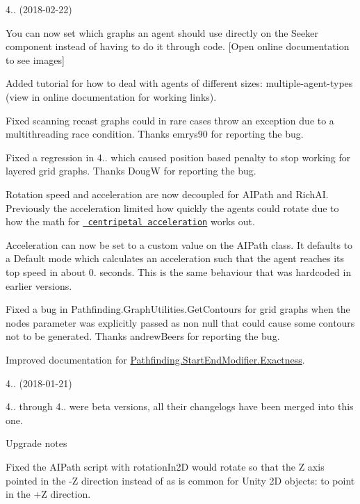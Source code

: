 \begin{DoxyItemize}
\item 4.. (2018-\/02-\/22)
\begin{DoxyItemize}
\item You can now set which graphs an agent should use directly on the Seeker component instead of having to do it through code. \mbox{[}Open online documentation to see images\mbox{]}
\item Added tutorial for how to deal with agents of different sizes\+: multiple-\/agent-\/types (view in online documentation for working links).
\item Fixed scanning recast graphs could in rare cases throw an exception due to a multithreading race condition. Thanks emrys90 for reporting the bug.
\item Fixed a regression in 4.. which caused position based penalty to stop working for layered grid graphs. Thanks DougW for reporting the bug.
\item Rotation speed and acceleration are now decoupled for A\+I\+Path and Rich\+AI. Previously the acceleration limited how quickly the agents could rotate due to how the math for \href{https://en.wikipedia.org/wiki/Centripetal_force}{\texttt{ centripetal acceleration}} works out.
\item Acceleration can now be set to a custom value on the A\+I\+Path class. It defaults to a \textquotesingle{}Default\textquotesingle{} mode which calculates an acceleration such that the agent reaches its top speed in about 0. seconds. This is the same behaviour that was hardcoded in earlier versions.
\item Fixed a bug in Pathfinding.\+Graph\+Utilities.\+Get\+Contours for grid graphs when the nodes parameter was explicitly passed as non null that could cause some contours not to be generated. Thanks andrew\+Beers for reporting the bug.
\item Improved documentation for \mbox{\hyperlink{class_pathfinding_1_1_start_end_modifier_a6fc53558e2ff2516f9329a7515f37a0b}{Pathfinding.\+Start\+End\+Modifier.\+Exactness}}.
\end{DoxyItemize}
\item 4.. (2018-\/01-\/21)
\begin{DoxyItemize}
\item 4.. through 4.. were beta versions, all their changelogs have been merged into this one.
\item Upgrade notes
\begin{DoxyItemize}
\item Fixed the A\+I\+Path script with rotation\+In2D would rotate so that the Z axis pointed in the -\/Z direction instead of as is common for Unity 2D objects\+: to point in the +Z direction.

\end{DoxyItemize}
\end{DoxyItemize}
\end{DoxyItemize}

